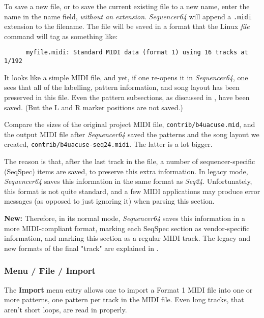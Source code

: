    To save a new file, or to save the current existing file to a new name,
   enter the name in the name field, \textsl{without an extension}.
   \textsl{Sequencer64} will append a \texttt{.midi} extension to the filename.
   The file will be saved in a format that the Linux \textsl{file} command
   will tag as something like:

   \begin{verbatim}
      myfile.midi: Standard MIDI data (format 1) using 16 tracks at 1/192
   \end{verbatim}

   It looks like a simple MIDI file, and yet, if one re-opens it in
   \textsl{Sequencer64}, one sees that all of the labelling, pattern information,
   and song layout has been preserved in this file.
   Even the pattern subsections, as discussed in
   ,
   have been saved.
   (But the L and R marker positions are not saved.)

   Compare the sizes of the original project MIDI file,
   \texttt{contrib/b4uacuse.mid}, and the output MIDI file after
   \textsl{Sequencer64} saved the patterns and the song layout we created,
   \texttt{contrib/b4uacuse-seq24.midi}.  The latter is a lot
   bigger.

   The reason is that, after the last track in the file, a number of
   sequencer-specific (SeqSpec) items are saved, to preserve this extra
   information.  In legacy mode, \textsl{Sequencer64} saves this information
   in the same format as \textsl{Seq24}.  Unfortunately, this format is
   not quite standard, and a few MIDI applications may produce error
   messages (as opposed to just ignoring it) when parsing this section. 
   
   \textbf{New:}
   Therefore, in its normal mode, \textsl{Sequencer64} saves this
   information in a more MIDI-compliant format, marking each SeqSpec section
   as vendor-specific information, and marking this section as a regular
   MIDI track.
   The legacy and new formats of the final "track" are explained in
   .

\subsubsection{Menu / File / Import}
\label{subsubsec:seq64_menu_file_import}

   The \textbf{Import} menu entry allows one to import a Format 1 MIDI file
   into one or more patterns, one pattern per track in the MIDI file.
   Even long tracks, that aren't short loops, are read in properly.


